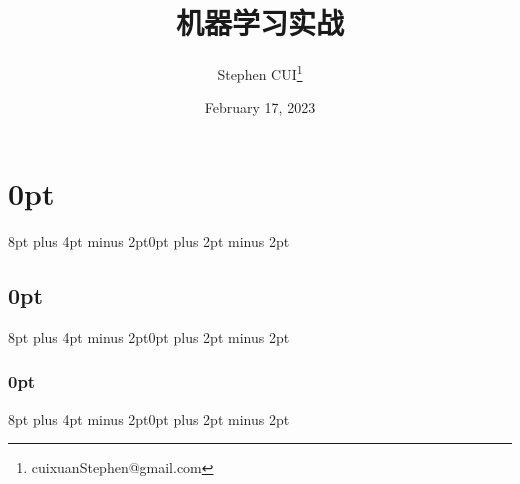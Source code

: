 \usepackage{amsmath}
\usepackage{mathptmx}
\usepackage{ctex}
\usepackage{minted}
\usepackage{tcolorbox}
\usepackage{epigraph}
\usepackage{caption}
\usepackage{graphicx}
\usepackage{listings}
\newtheorem{theorem}{Theorem}
\usepackage{tikz}
\usepackage{pifont}
\usepackage{tabularx}
\usepackage{framed}
\usepackage{algorithm}
\usepackage{titlesec}

\titlespacing\section{0pt}{8pt plus 4pt minus 2pt}{0pt plus 2pt minus 2pt}
\titlespacing\subsection{0pt}{8pt plus 4pt minus 2pt}{0pt plus 2pt minus 2pt}
\titlespacing\subsubsection{0pt}{8pt plus 4pt minus 2pt}{0pt plus 2pt minus 2pt}

\makeatletter
\let\old@endpart\@endpart
\renewcommand\@endpart[1][]{%
    \begin{quote}#1\end{quote}%
    \old@endpart}
\makeatother


\title{\textbf{机器学习实战}}

\author{Stephen CUI\thanks{cuixuanStephen@gmail.com}}
\date{February 17, 2023}

\newcommand\tips[1]{\textcolor{green!70!black}{#1}}
\newcommand\notes[1]{\textcolor{blue!70}{#1}}
\newcommand\important[1]{\textcolor{red!90!black}{#1}}

\newcommand\figures[1]{
    \begin{figure}
        \centering
        \texttt{[image: ../Codes/Figures/\#1.png]}
        \caption{#1}
        \label{#1}
    \end{figure}
}



